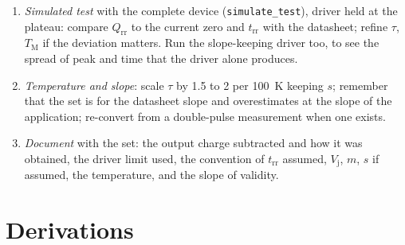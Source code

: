 \documentclass[10pt,a4paper]{scrartcl}
\newcommand{\Qrr}{Q_\mathrm{rr}}
\newcommand{\trr}{t_\mathrm{rr}}
\newcommand{\TM}{T_\mathrm{M}}
\newcommand{\Vj}{V_\mathrm{j}}
\begin{document}
\begin{enumerate}
\item \emph{Simulated test} with the complete device (\texttt{simulate\_test}), driver held at the plateau: compare $\Qrr$ to the current zero and $\trr$ with the datasheet; refine $\tau$, $\TM$ if the deviation matters. Run the slope-keeping driver too, to see the spread of peak and time that the driver alone produces.
\item \emph{Temperature and slope}: scale $\tau$ by 1.5 to 2 per \SI{100}{\kelvin} keeping $s$; remember that the set is for the datasheet slope and overestimates at the slope of the application; re-convert from a double-pulse measurement when one exists.
\item \emph{Document} with the set: the output charge subtracted and how it was obtained, the driver limit used, the convention of $\trr$ assumed, $\Vj$, $m$, $s$ if assumed, the temperature, and the slope of validity.
\end{enumerate}

\appendix
\section{Derivations}
\label{app:derivations}
\end{document}
